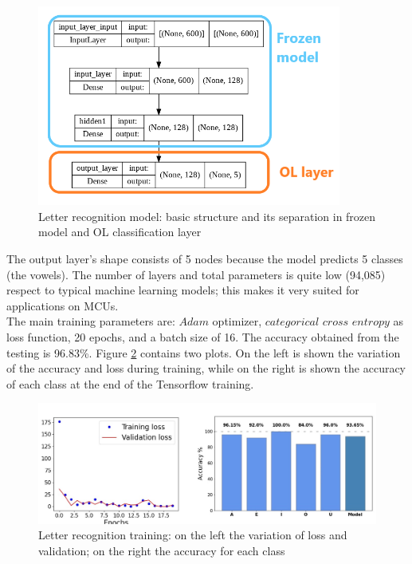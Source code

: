 \documentclass[12pt]{report}
\begin{document}
\begin{figure}[h!]
    \centering
    \includegraphics[width=100mm]{Figures/Chapter4/letter_structure.png} 
    \caption{Letter recognition model: basic structure and its separation in frozen model and OL classification layer}
    \label{fig:letter_structure}    
\end{figure}

The output layer's shape consists of 5 nodes because the model predicts 5 classes (the vowels). The number of layers and total parameters is quite low (94,085) respect to typical machine learning models; this makes it very suited for applications on MCUs. \\
The main training parameters are: $Adam$ optimizer, $categorical$ $cross$ $entropy$ as loss function, 20 epochs, and a batch size of 16. 
The accuracy obtained from the testing is 96.83\%. Figure \ref{fig:training_letters} contains two plots. On the left is shown the variation of the accuracy and loss during training, while on the right is shown the accuracy of each class at the end of the Tensorflow training.\\

\begin{figure}[h!]
    \centering
    \includegraphics[width=130mm]{Figures/Chapter4/training_letters.jpg} 
    \caption{Letter recognition training: on the left the variation of loss and validation; on the right the accuracy for each class}
    \label{fig:training_letters}    
\end{figure}
\end{document}
